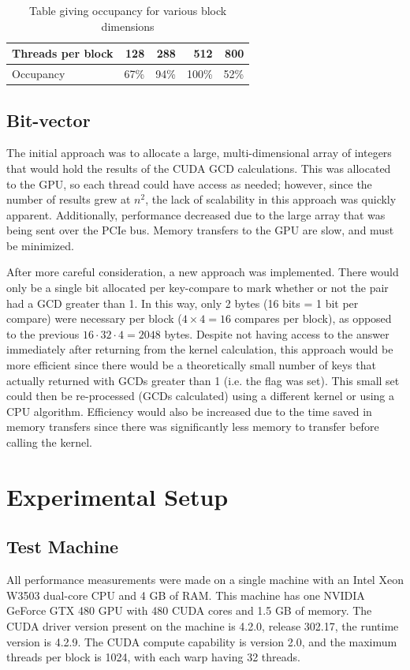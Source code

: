 \documentclass[12pt]{ucthesis}
\begin{document}
\begin{table}
   \centering
   \begin{tabular}{l|rrrr}
      Threads per block & 128 & 288 & 512 & 800\\
      \hline
              Occupancy & 67\% & 94\% & 100\% & 52\%\\
   \end{tabular}
   \caption{Table giving occupancy for various block 
     dimensions\label{tab:occupancy}}
 
\end{table}

\subsection{Bit-vector}
The initial approach was to allocate a large, multi-dimensional array of 
integers that would hold the results of the CUDA GCD calculations. This was 
allocated to the GPU, so each thread could have access as needed; however, 
since the number of results grew at $n^2$, the lack of scalability in this 
approach was quickly apparent. Additionally, performance decreased due to the 
large array that was being sent over the PCIe bus. Memory transfers to 
the GPU are slow, and must be minimized.

After more careful consideration, a new approach was implemented. There would 
only be a single bit allocated per key-compare to mark whether or not the pair 
had a GCD greater than 1. In this way, only 2 bytes (16 bits = 1 bit per 
compare) were necessary per block ($4\times4 = 16$ compares per block), as 
opposed to the previous $16 \cdot 32 \cdot 4 = 2048$ bytes. Despite not having access 
to the answer immediately after returning from the kernel calculation, this 
approach would be more efficient since there would be a theoretically small 
number of keys that actually returned with GCDs greater than 1 (i.e. the flag 
was set). This small set could then be re-processed (GCDs calculated) using a 
different kernel or using a CPU algorithm. Efficiency would also be increased 
due to the time saved in memory transfers since there was significantly less 
memory to transfer before calling the kernel.

\section{Experimental Setup}
\subsection{Test Machine}
All performance measurements were made on a single machine with an Intel Xeon 
W3503 dual-core CPU and 4 GB of RAM. This machine has one NVIDIA GeForce
GTX 480 GPU with 480 CUDA cores and 1.5 GB of memory. The CUDA driver 
version present on the machine is 4.2.0, release 302.17, the runtime version is
4.2.9. The CUDA compute capability is version 2.0, and the maximum threads per 
block is 1024, with each warp having 32 threads.
\end{document}
